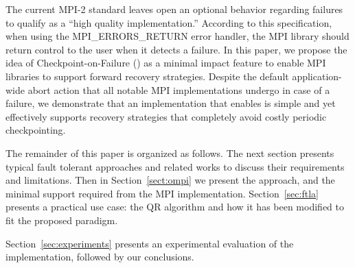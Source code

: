 The current MPI-2 standard leaves open an optional behavior regarding failures to qualify
as a ``high quality implementation.'' According to
this specification, when using the MPI\_ERRORS\_RETURN error handler,
the MPI library should return control to the user when it detects a
failure. In this paper, we propose the idea of Checkpoint-on-Failure (\cof) as
a minimal impact feature to enable MPI libraries to support
forward recovery strategies. Despite the default
application-wide abort action that all notable MPI implementations
undergo in case of a failure, we demonstrate that an implementation that
enables \cof is simple and yet effectively supports \abft recovery
strategies that completely avoid costly periodic checkpointing.

The remainder of this paper is organized as follows. The next section presents
typical fault tolerant approaches and related works to discuss their
requirements and limitations. Then in Section~\ref{sect:ompi} we present the
\cof approach, and the minimal support required from the MPI
implementation.  Section~\ref{sec:ftla} presents a practical use case:
the \abft QR algorithm and how it has been modified to fit the proposed
paradigm.
\begin{comment}
Section~\ref{sec:model} presents a performance model to assess the
efficiency of both periodic checkpointing with rollback recovery and On-Demand
Checkpointing, and
\end{comment}
Section~\ref{sec:experiments} presents an experimental
evaluation of the implementation, followed by our conclusions.



